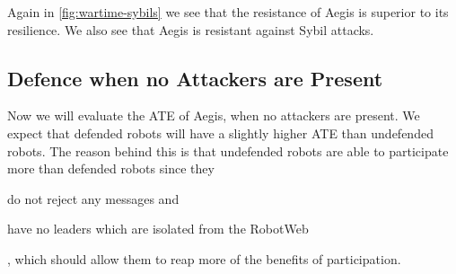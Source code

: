 Again in \autoref{fig:wartime-sybils} we see that the resistance of Aegis is superior to its resilience. We also see that Aegis is resistant against Sybil attacks.





\subsection{Defence when no Attackers are Present}
Now we will evaluate the ATE of Aegis, when no attackers are present. We expect that defended robots will have a slightly higher ATE than undefended robots. The reason behind this is that undefended robots are able to participate more than defended robots since they \begin{enumerate*}
    \item do not reject any messages and
    \item have no leaders which are isolated from the RobotWeb
\end{enumerate*}, which should allow them to reap more of the benefits of participation.

